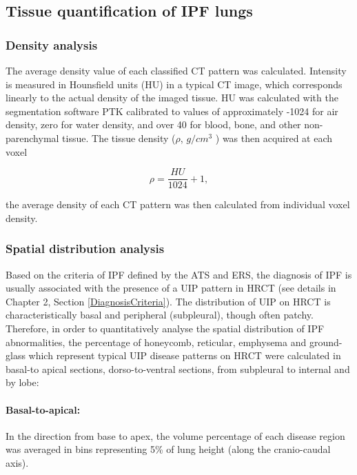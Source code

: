 \subsection{Tissue quantification of IPF lungs} \label{TissueQuantification}
\subsubsection{Density analysis}
The average density value of each classified CT pattern was calculated. Intensity is measured in Hounsfield units (HU) in a typical CT image, which corresponds linearly to the actual density of the imaged tissue. HU was calculated with the segmentation software PTK calibrated to values of approximately -1024 for air density, zero for water density, and over 40 for blood, bone, and other non-parenchymal tissue. The tissue density ($\rho$, $g/cm^3$ ) was then acquired at each voxel

\begin{equation}
\rho = \frac{HU}{1024} + 1,
\end{equation}

\noindent the average density of each CT pattern was then calculated from individual voxel density.

\subsubsection{Spatial distribution analysis}
Based on the criteria of IPF defined by the ATS and ERS, the diagnosis of IPF is usually associated with the presence of a UIP pattern in HRCT (see details in Chapter 2, Section \ref{DiagnosisCriteria}). The distribution of UIP on HRCT is characteristically basal and peripheral (subpleural), though often patchy. Therefore, in order to quantitatively analyse the spatial distribution of IPF abnormalities, the percentage of honeycomb, reticular, emphysema and ground-glass which represent typical UIP disease patterns on HRCT were calculated in basal-to apical sections, dorso-to-ventral sections, from subpleural to internal and by lobe: 
\newpage

\paragraph{Basal-to-apical:} In the direction from base to apex, the volume percentage of each disease region was averaged in bins representing 5\% of lung height (along the cranio-caudal axis). 

